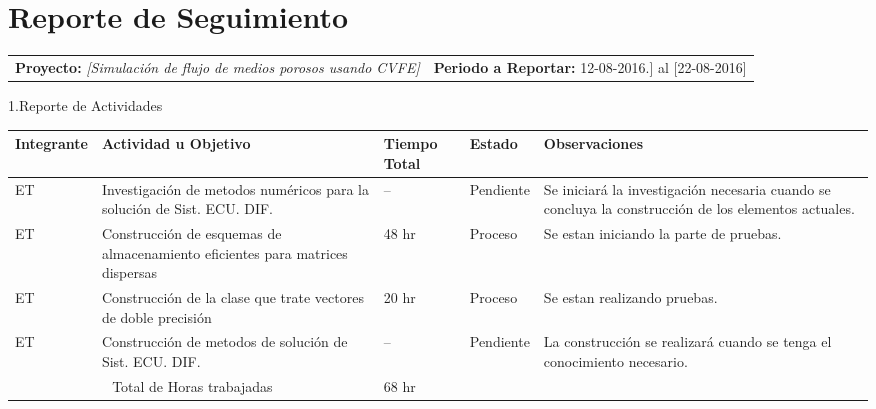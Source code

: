 \documentclass[12pt]{report}
\numberwithin{equation}{section}
\begin{document}
\newpage


\centering \section{Reporte de Seguimiento} 

\begin{flushleft}

\begin{tabular}{m{7cm} m{8cm}}
\small{ \textbf{Proyecto:}} \scriptsize{\textit{[Simulaci\'on de flujo de medios porosos usando CVFE]}} & \small{\textbf{Periodo a Reportar:}} \scriptsize{12-08-2016.] al [22-08-2016]}
\end{tabular}



\large{1.Reporte de Actividades }\\


\begin{table}[H]
\begin{tabular}{|m{2cm}|m{4.5cm}|m{1.5cm}|m{1.5cm}|m{4.5cm}|}
\hline
\small{\textbf{Integrante}} &\small{ \textbf{Actividad u Objetivo}} &\small{ \textbf{Tiempo Total}} & \small{\textbf{Estado} }& \small{\textbf{Observaciones}}\\
\hline \hline
ET &Investigaci\'on de metodos num\'ericos para la soluci\'on de Sist. ECU. DIF.  & -- & Pendiente & \small{Se iniciar\'a la investigaci\'on necesaria cuando se concluya la construcci\'on de los elementos actuales.}\\
\hline
ET & Construcci\'on de esquemas de almacenamiento eficientes para matrices dispersas  & 48 hr & Proceso & \small{Se estan iniciando la parte de pruebas.}\\
\hline
ET & Construcci\'on de la clase que trate vectores de doble precisi\'on  & 20 hr & Proceso & \small{Se estan realizando pruebas.}\\
\hline
ET & Construcci\'on de metodos de soluci\'on de  Sist. ECU. DIF.  & -- & Pendiente & \small{La construcci\'on se realizar\'a cuando se tenga el conocimiento necesario.}\\
\hline
\multicolumn{2}{|c|}{Total de Horas trabajadas} & 68 hr  & & \\
\hline 
\end{tabular}
\label{tabla: TABLA CE Actividades}
\end{table}



\end{flushleft}
\end{document}
